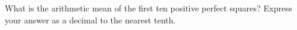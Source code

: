 What is the arithmetic mean of the first ten positive perfect squares? Express your answer as a decimal to the nearest tenth.
